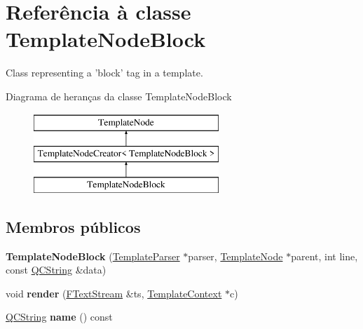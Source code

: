 \hypertarget{class_template_node_block}{\section{Referência à classe Template\-Node\-Block}
\label{class_template_node_block}
}


Class representing a 'block' tag in a template.  


Diagrama de heranças da classe Template\-Node\-Block\begin{figure}[H]
\begin{center}
\leavevmode
\includegraphics[height=3.000000cm]{class_template_node_block}
\end{center}
\end{figure}
\subsection*{Membros públicos}
\begin{DoxyCompactItemize}
\item 
\hypertarget{class_template_node_block_aed38cb64f2f682835d1aabea94b76df2}{{\bfseries Template\-Node\-Block} (\hyperlink{class_template_parser}{Template\-Parser} $\ast$parser, \hyperlink{class_template_node}{Template\-Node} $\ast$parent, int line, const \hyperlink{class_q_c_string}{Q\-C\-String} \&data)}\label{class_template_node_block_aed38cb64f2f682835d1aabea94b76df2}

\item 
\hypertarget{class_template_node_block_aaa6575d8c79eeaa49f849f1ca1d6b228}{void {\bfseries render} (\hyperlink{class_f_text_stream}{F\-Text\-Stream} \&ts, \hyperlink{class_template_context}{Template\-Context} $\ast$c)}\label{class_template_node_block_aaa6575d8c79eeaa49f849f1ca1d6b228}

\item 
\hypertarget{class_template_node_block_af92302878527ec555ba9e3fe066925ff}{\hyperlink{class_q_c_string}{Q\-C\-String} {\bfseries name} () const }\label{class_template_node_block_af92302878527ec555ba9e3fe066925ff}

\end{DoxyCompactItemize}
